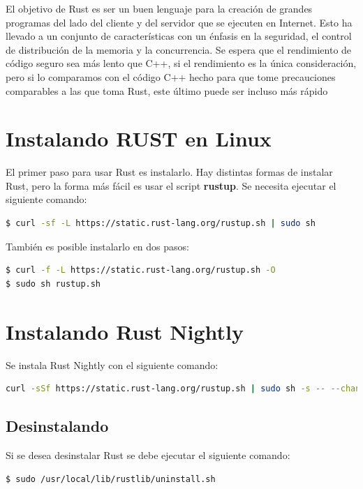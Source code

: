 \documentclass[12pt, twoside]{report}
\begin{document}
El objetivo de Rust es ser un buen lenguaje para la creación de grandes programas del lado del cliente y del servidor que se ejecuten en Internet. Esto ha llevado a un conjunto de características con un énfasis en la seguridad, el control de distribución de la memoria y la concurrencia. Se espera que el rendimiento de código seguro sea más lento que C++, si el rendimiento es la única consideración, pero si lo comparamos con el código C++ hecho para que tome precauciones comparables a las que toma Rust, este último puede ser incluso más rápido


\section{Instalando RUST en Linux}

El primer paso para usar Rust es instalarlo. Hay distintas formas de instalar Rust, pero la forma más fácil es usar el script \textbf{rustup}. Se necesita ejecutar el siguiente comando:

\begin{lstlisting}[language=bash]
$ curl -sf -L https://static.rust-lang.org/rustup.sh | sudo sh
\end{lstlisting}

También es posible instalarlo en dos pasos:

\begin{lstlisting}[language=bash]
$ curl -f -L https://static.rust-lang.org/rustup.sh -O
$ sudo sh rustup.sh
\end{lstlisting}


\section{Instalando Rust Nightly}
Se instala Rust Nightly con el siguiente comando:

\begin{lstlisting}[language=bash]
curl -sSf https://static.rust-lang.org/rustup.sh | sudo sh -s -- --channel=nightly --yes
\end{lstlisting}


\subsection{Desinstalando}

Si se desea desinstalar Rust se debe ejecutar el siguiente comando:

\begin{lstlisting}[language=bash]
$ sudo /usr/local/lib/rustlib/uninstall.sh
\end{lstlisting}
\end{document}
